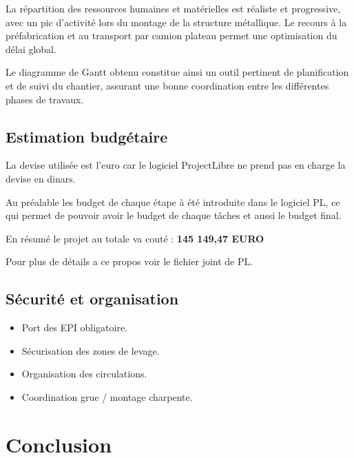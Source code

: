 \documentclass[12pt,a4paper]{report}
\begin{document}
	La répartition des ressources humaines et matérielles est réaliste et progressive, avec un pic d’activité lors du montage de la structure métallique. Le recours à la préfabrication et au transport par camion plateau permet une optimisation du délai global.
	
	\vspace{\baselineskip}
	
	Le diagramme de Gantt obtenu constitue ainsi un outil pertinent de planification et de suivi du chantier, assurant une bonne coordination entre les différentes phases de travaux.
	
	\section{Estimation budgétaire}
	
	La devise utilisée est l'euro car le logiciel ProjectLibre ne prend pas en charge la devise en dinars.
	
	Au préalable les budget de chaque étape à été introduite dans le logiciel PL, ce qui permet de pouvoir avoir le budget de chaque tâches et aussi le budget final.
	
	\vspace{\baselineskip}
	
	En résumé le projet au totale va couté : \textbf{145 149,47 EURO}
	
	Pour plus de détails a ce propos voir le fichier joint de PL.
	
	\section{Sécurité et organisation}
	
	\begin{itemize}
		\item Port des EPI obligatoire.
		
		\item Sécurisation des zones de levage.
		
		\item Organisation des circulations.
		
		\item Coordination grue / montage charpente.
	\end{itemize}
	
	\chapter*{Conclusion}
	
\end{document}
